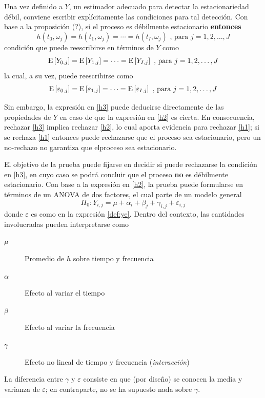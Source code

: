 Una vez definido a $Y$, un estimador adecuado para detectar la estacionariedad débil, conviene escribir explícitamente las condiciones para tal detección.
%
Con base a la proposición (?), si el proceso \xt es débilmente estacionario \textbf{entonces}
%
\begin{equation}
h(t_0,\omega_j) = h(t_1,\omega_j) = \cdots = h(t_I,\omega_j) \text{ , para } j = 1, 2, \dots , J
\label{h1}
\end{equation}
%
condición que puede reescribirse en términos de $Y$ como
%
\begin{equation}
\mathrm{E}\left[ Y_{0,j} \right] = \mathrm{E}\left[ Y_{1,j} \right] = \cdots = \mathrm{E}\left[ Y_{I,j} \right] \text{ , para } j = 1, 2, \dots , J
\label{h2}
\end{equation}
%
la cual, a su vez, puede reescribirse como
\begin{equation}
\mathrm{E}\left[ \varepsilon_{0,j} \right] = \mathrm{E}\left[ \varepsilon_{1,j} \right] = \cdots = \mathrm{E}\left[ \varepsilon_{I,j} \right] \text{ , para } j = 1, 2, \dots , J
\label{h3}
\end{equation}

Sin embargo, la expresión en \ref{h3} puede deducirse directamente de las propiedades de $Y$ en caso de que la expresión en \ref{h2} es cierta. 
%
En consecuencia, rechazar \ref{h3} implica rechazar \ref{h2}, lo cual aporta evidencia para rechazar \ref{h1}; si se rechaza \ref{h1} entonces puede rechazarse que el proceso sea estacionario, pero un no-rechazo no garantiza que elproceso sea estacionario.

El objetivo de la prueba puede fijarse en decidir si puede rechazarse la condición en \ref{h3}, en cuyo caso se podrá concluir que el proceso \textbf{no} es débilmente estacionario.
%
Con base a la expresión en \ref{h2}, la prueba puede formularse en términos de un ANOVA de dos
factores, el cual parte de un modelo general
%
\begin{equation}
H_0 : Y_{i,j} = \mu + \alpha_i + \beta_j + \gamma_{i,j} + \varepsilon_{i,j}
\end{equation}
%
donde $\varepsilon$ es como en la expresión \ref{def:ye}.
%
Dentro del contexto, las cantidades involucradas pueden interpretarse como
\begin{description}
\item[$\mu$] Promedio de $h$ sobre tiempo y frecuencia
\item[$\alpha$] Efecto al variar el tiempo
\item[$\beta$] Efecto al variar la frecuencia
\item[$\gamma$] Efecto no lineal de tiempo y frecuencia (\textit{interacción})
\end{description}
%
La diferencia entre $\gamma$ y $\varepsilon$ consiste en que (por diseño) se conocen la media y 
varianza de $\varepsilon$;
en contraparte, no se ha supuesto nada sobre $\gamma$.

